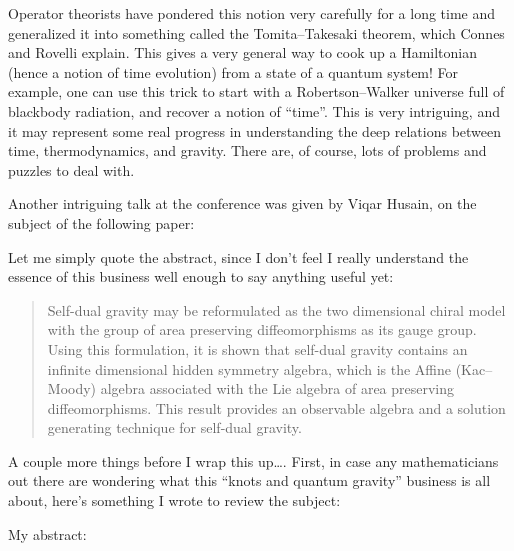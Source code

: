 \documentclass[12pt]{article}
\def\tightlist{}
\renewcommand{\texttt}[1]{%
  \begingroup
  \ttfamily
  \begingroup\lccode`~=`/\lowercase{\endgroup\def~}{/\discretionary{}{}{}}%
  \begingroup\lccode`~=`[\lowercase{\endgroup\def~}{[\discretionary{}{}{}}%
  \begingroup\lccode`~=`.\lowercase{\endgroup\def~}{.\discretionary{}{}{}}%
  \catcode`/=\active\catcode`[=\active\catcode`.=\active
  \scantokens{#1\noexpand}%
  \endgroup
}
\begin{document}
Operator theorists have pondered this notion very carefully for a long
time and generalized it into something called the Tomita--Takesaki
theorem, which Connes and Rovelli explain. This gives a very general way
to cook up a Hamiltonian (hence a notion of time evolution) from a state
of a quantum system! For example, one can use this trick to start with a
Robertson--Walker universe full of blackbody radiation, and recover a
notion of ``time''. This is very intriguing, and it may represent some
real progress in understanding the deep relations between time,
thermodynamics, and gravity. There are, of course, lots of problems and
puzzles to deal with.

Another intriguing talk at the conference was given by Viqar Husain, on
the subject of the following paper:

\noindent
Let me simply quote the abstract, since I don't feel I really understand
the essence of this business well enough to say anything useful yet:

\begin{quote}
Self-dual gravity may be reformulated as the two dimensional chiral
model with the group of area preserving diffeomorphisms as its gauge
group. Using this formulation, it is shown that self-dual gravity
contains an infinite dimensional hidden symmetry algebra, which is the
Affine (Kac--Moody) algebra associated with the Lie algebra of area
preserving diffeomorphisms. This result provides an observable algebra
and a solution generating technique for self-dual gravity.
\end{quote}

A couple more things before I wrap this up\ldots. First, in case any
mathematicians out there are wondering what this ``knots and quantum
gravity'' business is all about, here's something I wrote to review the
subject:

\noindent
My abstract:
\end{document}
